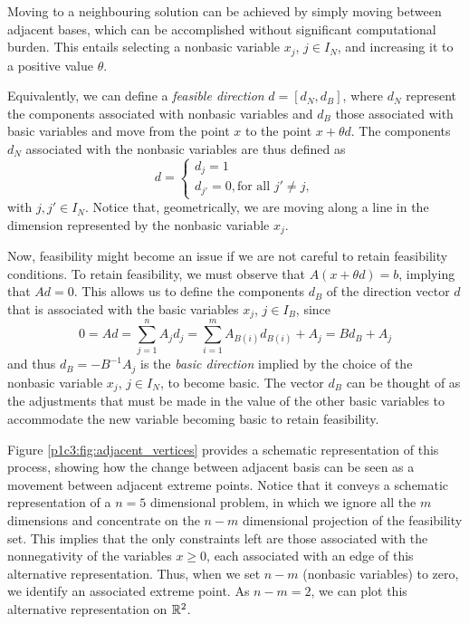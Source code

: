 Moving to a neighbouring solution can be achieved by simply moving between adjacent bases, which can be accomplished without significant computational burden. This entails selecting a nonbasic variable $x_j$, $j \in I_N$, and increasing it to a positive value $\theta$. 

Equivalently, we can define a \emph{feasible direction} $d = [d_N, d_B]$, where $d_N$ represent the components associated with nonbasic variables and $d_B$ those associated with basic variables and move from the point $x$ to the point $x + \theta d$. The components $d_N$ associated with the nonbasic variables are thus defined as 
%
\begin{equation*}
d = \begin{cases} d_j = 1 \\ 
				  d_{j'} = 0, \text{for all } j' \neq j, 
	\end{cases}	
\end{equation*}
%
with $j, j' \in I_N$. Notice that, geometrically, we are moving along a line in the dimension represented by the nonbasic variable $x_j$.

Now, feasibility might become an issue if we are not careful to retain feasibility conditions. To retain feasibility, we must observe that $A(x + \theta d) = b$, implying that $Ad = 0$. This allows us to define the components $d_B$ of the direction vector $d$ that is associated with the basic variables $x_j$, $j \in I_B$, since
%
\begin{equation*}
	0 = Ad = \sum_{j = 1}^n	A_j d_j = \sum_{i = 1}^m A_{B(i)}d_{B(i)} + A_j = Bd_B + A_j
\end{equation*}
%
and thus $d_B = -B^{-1} A_j$ is the \emph{basic direction} implied by the choice of the nonbasic variable $x_j$, $j \in I_N$, to become basic. The vector $d_B$ can be thought of as the adjustments that must be made in the value of the other basic variables to accommodate the new variable becoming basic to retain feasibility. 


Figure \ref{p1c3:fig:adjacent_vertices} provides a schematic representation of this process, showing how the change between adjacent basis can be seen as a movement between adjacent extreme points. Notice that it conveys a schematic representation of a $n=5$ dimensional problem, in which we ignore all the $m$ dimensions and concentrate on the $n-m$ dimensional projection of the feasibility set. This implies that the only constraints left are those associated with the nonnegativity of the variables $x \ge 0$, each associated with an edge of this alternative representation. Thus, when we set $n-m$ (nonbasic variables) to zero, we identify an associated extreme point. As $n-m = 2$, we can plot this alternative representation on $\mathbb{R}^2$.


